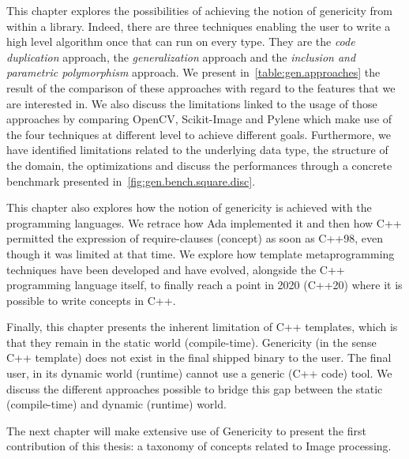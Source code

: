 This chapter explores the possibilities of achieving the notion of genericity from within a library. Indeed, there are
three techniques enabling the user to write a high level algorithm once that can run on every type. They are the
\emph{code duplication} approach, the \emph{generalization} approach and the \emph{inclusion and parametric
  polymorphism} approach. We present in~\cref{table:gen.approaches} the result of the comparison of these approaches with
regard to the features that we are interested in. We also discuss the limitations linked to the usage of those
approaches by comparing OpenCV, Scikit-Image and Pylene which make use of the four techniques at different level to
achieve different goals. Furthermore, we have identified limitations related to the underlying data type, the structure of the
domain, the optimizations and discuss the performances through a concrete benchmark presented
in~\cref{fig:gen.bench.square.disc}.

This chapter also explores how the notion of genericity is achieved with the programming languages. We retrace how Ada
implemented it and then how C++ permitted the expression of require-clauses (concept) as soon as C++98, even though it
was limited at that time. We explore how template metaprogramming techniques have been developed and have evolved,
alongside the C++ programming language itself, to finally reach a point in 2020 (C++20) where it is possible to write
concepts in C++.

Finally, this chapter presents the inherent limitation of C++ templates, which is that they remain in the static world
(compile-time). Genericity (in the sense C++ template) does not exist in the final shipped binary to the user. The final
user, in its dynamic world (runtime) cannot use a generic (C++ code) tool. We discuss the different approaches possible
to bridge this gap between the static (compile-time) and dynamic (runtime) world.

The next chapter will make extensive use of Genericity to present the first contribution of this thesis: a taxonomy of
concepts related to Image processing.
